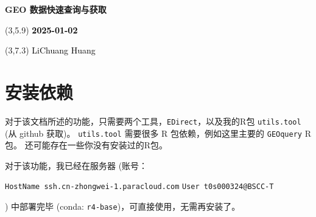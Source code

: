 \documentclass[
]{article}
\author{}
\date{\vspace{-2.5em}}
\newenvironment{Shaded}{\begin{snugshade}}{\end{snugshade}}
\newcommand{\CommentTok}[1]{\textcolor[rgb]{0.56,0.35,0.01}{\textit{#1}}}
\newcommand{\KeywordTok}[1]{\textcolor[rgb]{0.13,0.29,0.53}{\textbf{#1}}}
\newcommand{\NormalTok}[1]{#1}
\newcommand{\OperatorTok}[1]{\textcolor[rgb]{0.81,0.36,0.00}{\textbf{#1}}}
\newcommand{\StringTok}[1]{\textcolor[rgb]{0.31,0.60,0.02}{#1}}
\begin{document}
\begin{titlepage} 
\begin{center} \textbf{\Huge GEO
数据快速查询与获取} \vspace{4em}
\begin{textblock}{10}(3,5.9) \huge
\textbf{\textcolor{black}{2025-01-02}}
\end{textblock} \begin{textblock}{10}(3,7.3)
\Large \textcolor{black}{LiChuang Huang}
\end{textblock} \end{center} \end{titlepage}
\restoregeometry

\hypertarget{ux5b89ux88c5ux4f9dux8d56}{%
\section{安装依赖}\label{ux5b89ux88c5ux4f9dux8d56}}

对于该文档所述的功能，只需要两个工具，\texttt{EDirect}，以及我的R包 \texttt{utils.tool} (从 github 获取)。
\texttt{utils.tool} 需要很多 R 包依赖，例如这里主要的 \texttt{GEOquery} R 包。
还可能存在一些你没有安装过的R包。

对于该功能，我已经在服务器 (账号：

\texttt{HostName\ ssh.cn-zhongwei-1.paracloud.com} \newline
\texttt{User\ t0s000324@BSCC-T} \newline

) 中部署完毕 (conda: \texttt{r4-base})，可直接使用，无需再安装了。

\begin{Shaded}
\end{Shaded}
\end{document}
